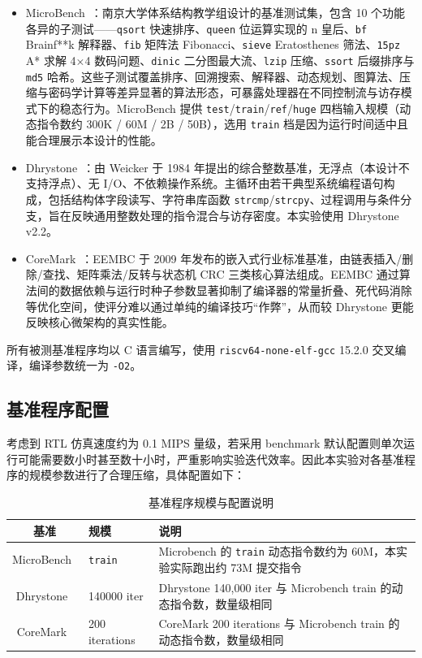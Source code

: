 \begin{itemize}
  \item MicroBench~\cite{microbench2024}：南京大学体系结构教学组设计的基准测试集，包含 10 个功能各异的子测试——\lstinline|qsort| 快速排序、\lstinline|queen| 位运算实现的 n 皇后、\lstinline|bf| Brainf**k 解释器、\lstinline|fib| 矩阵法 Fibonacci、\lstinline|sieve| Eratosthenes 筛法、\lstinline|15pz| A* 求解 4×4 数码问题、\lstinline|dinic| 二分图最大流、\lstinline|lzip| 压缩、\lstinline|ssort| 后缀排序与 \lstinline|md5| 哈希。这些子测试覆盖排序、回溯搜索、解释器、动态规划、图算法、压缩与密码学计算等差异显著的算法形态，可暴露处理器在不同控制流与访存模式下的稳态行为。MicroBench 提供 \lstinline|test|/\lstinline|train|/\lstinline|ref|/\lstinline|huge| 四档输入规模（动态指令数约 300K / 60M / 2B / 50B），选用 \lstinline|train| 档是因为运行时间适中且能合理展示本设计的性能。
  \item Dhrystone~\cite{weicker1984dhrystone}：由 Weicker 于 1984 年提出的综合整数基准，无浮点（本设计不支持浮点）、无 I/O、不依赖操作系统。主循环由若干典型系统编程语句构成，包括结构体字段读写、字符串库函数 \lstinline|strcmp|/\lstinline|strcpy|、过程调用与条件分支，旨在反映通用整数处理的指令混合与访存密度。本实验使用 Dhrystone v2.2。
  \item CoreMark~\cite{coremark2009}：EEMBC 于 2009 年发布的嵌入式行业标准基准，由链表插入/删除/查找、矩阵乘法/反转与状态机 CRC 三类核心算法组成。EEMBC 通过算法间的数据依赖与运行时种子参数显著抑制了编译器的常量折叠、死代码消除等优化空间，使评分难以通过单纯的编译技巧“作弊”，从而较 Dhrystone 更能反映核心微架构的真实性能。
\end{itemize}

所有被测基准程序均以 C 语言编写，使用 \lstinline|riscv64-none-elf-gcc| 15.2.0 交叉编译，编译参数统一为 \lstinline|-O2|。

\subsection{基准程序配置}

考虑到 RTL 仿真速度约为 0.1 MIPS 量级，若采用 benchmark 默认配置则单次运行可能需要数小时甚至数十小时，严重影响实验迭代效率。因此本实验对各基准程序的规模参数进行了合理压缩，具体配置如下：

\begin{table}[H]
  \centering
  \caption{基准程序规模与配置说明}
  \label{tbl:perf-bench-config}
  \begin{tabular}{cll}
    \toprule
    基准 & 规模 & 说明 \\
    \midrule
    MicroBench~\cite{microbench2024} & \lstinline|train| & Microbench 的 \lstinline|train| 动态指令数约为 60M，本实验实际跑出约 73M 提交指令 \\
    Dhrystone~\cite{weicker1984dhrystone} & 140000 iter & Dhrystone 140,000 iter 与 Microbench train 的动态指令数，数量级相同 \\
    CoreMark~\cite{coremark2009} & 200 iterations & CoreMark 200 iterations 与 Microbench train 的动态指令数，数量级相同 \\
    \bottomrule
  \end{tabular}
\end{table}

